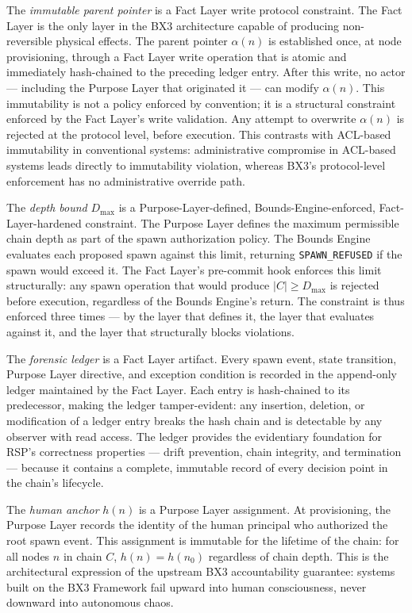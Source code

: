 The \emph{immutable parent pointer} is a Fact Layer write protocol constraint. The Fact Layer is the only layer in the BX3 architecture capable of producing non-reversible physical effects. The parent pointer $\alpha(n)$ is established once, at node provisioning, through a Fact Layer write operation that is atomic and immediately hash-chained to the preceding ledger entry. After this write, no actor --- including the Purpose Layer that originated it --- can modify $\alpha(n)$. This immutability is not a policy enforced by convention; it is a structural constraint enforced by the Fact Layer's write validation. Any attempt to overwrite $\alpha(n)$ is rejected at the protocol level, before execution. This contrasts with ACL-based immutability in conventional systems: administrative compromise in ACL-based systems leads directly to immutability violation, whereas BX3's protocol-level enforcement has no administrative override path.

The \emph{depth bound} $D_{\max}$ is a Purpose-Layer-defined, Bounds-Engine-enforced, Fact-Layer-hardened constraint. The Purpose Layer defines the maximum permissible chain depth as part of the spawn authorization policy. The Bounds Engine evaluates each proposed spawn against this limit, returning \texttt{SPAWN\_REFUSED} if the spawn would exceed it. The Fact Layer's pre-commit hook enforces this limit structurally: any spawn operation that would produce $|C| \geq D_{\max}$ is rejected before execution, regardless of the Bounds Engine's return. The constraint is thus enforced three times --- by the layer that defines it, the layer that evaluates against it, and the layer that structurally blocks violations.

The \emph{forensic ledger} is a Fact Layer artifact. Every spawn event, state transition, Purpose Layer directive, and exception condition is recorded in the append-only ledger maintained by the Fact Layer. Each entry is hash-chained to its predecessor, making the ledger tamper-evident: any insertion, deletion, or modification of a ledger entry breaks the hash chain and is detectable by any observer with read access. The ledger provides the evidentiary foundation for RSP's correctness properties --- drift prevention, chain integrity, and termination --- because it contains a complete, immutable record of every decision point in the chain's lifecycle.

The \emph{human anchor} $h(n)$ is a Purpose Layer assignment. At provisioning, the Purpose Layer records the identity of the human principal who authorized the root spawn event. This assignment is immutable for the lifetime of the chain: for all nodes $n$ in chain $C$, $h(n) = h(n_0)$ regardless of chain depth. This is the architectural expression of the upstream BX3 accountability guarantee: systems built on the BX3 Framework fail upward into human consciousness, never downward into autonomous chaos.

